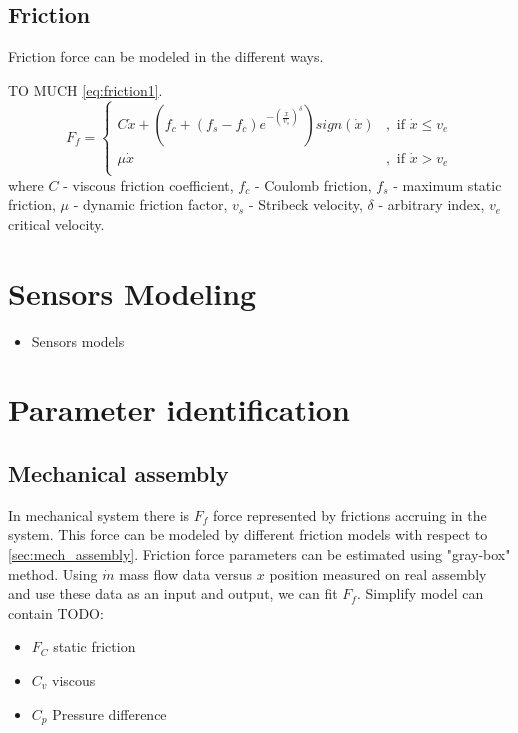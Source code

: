 \subsection{Friction}
Friction force can be modeled in the
different ways.

TO MUCH
\ref{eq:friction1}.
\begin{equation}
    F_f = 
    \begin{cases}
        C \dot{x} + \left(f_c + (f_s-f_c)
        e^{-\left(\frac{\dot{x}}{v_s}\right)^{\delta}}\right) sign(\dot{x}) &,
        \text{ if } \dot{x} \le v_e \\
        \mu \dot{x} &,
        \text{ if } \dot{x} > v_e \\
    \end{cases}
    \label{eq:friction1}
\end{equation}
where $C$ - viscous friction coefficient, $f_c$ - Coulomb friction, $f_s$ -
maximum static friction, $\mu$ - dynamic friction factor, $v_s$ - Stribeck velocity,
$\delta$ - arbitrary index, $v_e$ critical velocity.


\section{Sensors Modeling}
\begin{itemize}
    \item Sensors models
\end{itemize}

\section{Parameter identification}

\subsection{Mechanical assembly}
In mechanical system there is $F_f$ force represented by frictions accruing
in the system. This force can be modeled by different friction models with
respect to \ref{sec:mech_assembly}. Friction force parameters can be
estimated using "gray-box" method. 
Using $\dot{m}$ mass flow data versus $x$ position measured on real assembly
and use these data as an input and output, we can fit $F_f$.
Simplify model can contain TODO:
\begin{itemize}
    \item $F_C$ static friction
    \item $C_v$ viscous
    \item $C_p$ Pressure difference
\end{itemize}

